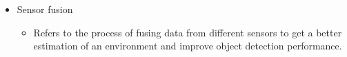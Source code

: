 \documentclass[rnd]{mas_proposal}
\begin{document}
\begin{itemize}
\begin{itemize}
\begin{itemize}
                    \end{itemize}
              \item Sensor fusion
                    \begin{itemize}
                        \item Refers to the process of fusing data from different sensors to get a better estimation of an environment and improve object detection performance.
                    \end{itemize}
          \end{itemize}







\end{itemize}
\end{document}
